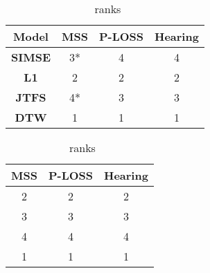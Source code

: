 \begin{table}[htbp]
\begin{minipage}{0.45\textwidth}
    \centering
    \begin{tabular}{|c|c|c|c|}
    \hline
    \textbf{Model} & \textbf{MSS} & \textbf{P-LOSS} & \textbf{Hearing} \\
    \hline
    \textbf{SIMSE} & 3* & 4\phantom{*} & 4\phantom{*} \\
    \textbf{L1}    & 2\phantom{*} & 2\phantom{*} & 2\phantom{*} \\
    \textbf{JTFS}  & 4* & 3\phantom{*} & 3\phantom{*} \\
    \textbf{DTW}   & 1\phantom{*} & 1\phantom{*} & 1\phantom{*} \\
    \hline
    \end{tabular}
    \caption{\footnotesize \AmpMod~ranks}
    \label{tab:p2}
\end{minipage}%
\hspace{1cm}
\begin{minipage}{0.45\textwidth}
    \centering
    \begin{tabular}{|c|c|c|}
    \hline
    \textbf{MSS} & \textbf{P-LOSS} & \textbf{Hearing} \\
    \hline
    2\phantom{*} & 2\phantom{*} & 2\phantom{*} \\
    3\phantom{*} & 3\phantom{*} & 3\phantom{*} \\
    4\phantom{*} & 4\phantom{*} & 4\phantom{*} \\
    1\phantom{*} & 1\phantom{*} & 1\phantom{*} \\
    \hline
    \end{tabular}
    \caption{\footnotesize \FMMod~ranks}
    \label{tab:p3}
\end{minipage}
\end{table}
